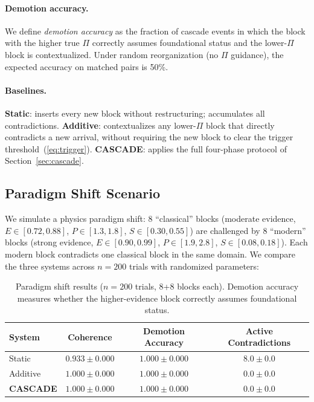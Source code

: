\documentclass[11pt,a4paper]{article}
\theoremstyle{definition}
\newcommand{\tp}{\Pi}
\begin{document}
\paragraph{Demotion accuracy.} We define \emph{demotion accuracy} as the fraction of
cascade events in which the block with the higher true $\tp$ correctly assumes
foundational status and the lower-$\tp$ block is contextualized. Under random
reorganization (no $\tp$ guidance), the expected accuracy on matched pairs is 50\%.

\paragraph{Baselines.} \textbf{Static}: inserts every new block without restructuring;
accumulates all contradictions. \textbf{Additive}: contextualizes any lower-$\tp$ block
that directly contradicts a new arrival, without requiring the new block to clear the
trigger threshold~(\ref{eq:trigger}). \textbf{CASCADE}: applies the full four-phase
protocol of Section~\ref{sec:cascade}.

\subsection{Paradigm Shift Scenario}\label{sec:paradigm}

We simulate a physics paradigm shift: 8 ``classical'' blocks (moderate evidence, $E \in
[0.72, 0.88]$, $P \in [1.3, 1.8]$, $S \in [0.30, 0.55]$) are challenged by 8
``modern'' blocks (strong evidence, $E \in [0.90, 0.99]$, $P \in [1.9, 2.8]$, $S \in
[0.08, 0.18]$). Each modern block contradicts one classical block in the same domain.
We compare the three systems across $n = 200$ trials with randomized parameters:

\begin{table}[H]
\centering
\caption{Paradigm shift results ($n=200$ trials, 8+8 blocks each). Demotion accuracy
measures whether the higher-evidence block correctly assumes foundational status.}
\label{tab:paradigm}
\begin{tabular}{@{}lccc@{}}
\toprule
\textbf{System} & \textbf{Coherence} & \textbf{Demotion Accuracy} & \textbf{Active Contradictions} \\
\midrule
Static   & $0.933 \pm 0.000$ & $1.000 \pm 0.000$ & $8.0 \pm 0.0$ \\
Additive & $1.000 \pm 0.000$ & $1.000 \pm 0.000$ & $0.0 \pm 0.0$ \\
\textbf{CASCADE} & $\mathbf{1.000 \pm 0.000}$ & $\mathbf{1.000 \pm 0.000}$ & $\mathbf{0.0 \pm 0.0}$ \\
\bottomrule
\end{tabular}
\end{table}
\end{document}
